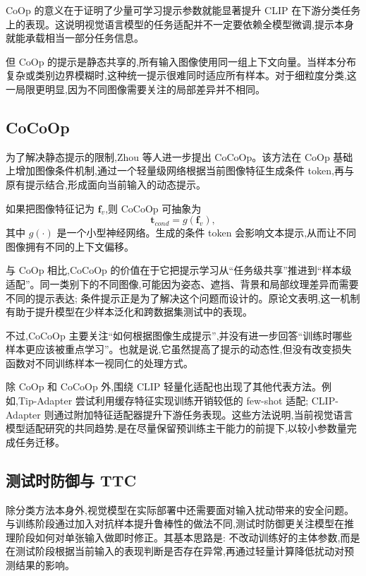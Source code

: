 CoOp 的意义在于证明了少量可学习提示参数就能显著提升 CLIP 在下游分类任务上的表现\cite{coop2022}。这说明视觉语言模型的任务适配并不一定要依赖全模型微调,提示本身就能承载相当一部分任务信息。

但 CoOp 的提示是静态共享的,所有输入图像使用同一组上下文向量。当样本分布复杂或类别边界模糊时,这种统一提示很难同时适应所有样本。对于细粒度分类,这一局限更明显,因为不同图像需要关注的局部差异并不相同。

\subsection{CoCoOp}

为了解决静态提示的限制,Zhou 等人进一步提出 CoCoOp\cite{cocoop2022}。该方法在 CoOp 基础上增加图像条件机制,通过一个轻量级网络根据当前图像特征生成条件 token,再与原有提示结合,形成面向当前输入的动态提示。

如果把图像特征记为 \(\mathbf{f}_v\),则 CoCoOp 可抽象为
\begin{equation}
\mathbf{t}_{cond}=g(\mathbf{f}_v),
\end{equation}
其中 \(g(\cdot)\) 是一个小型神经网络。生成的条件 token 会影响文本提示,从而让不同图像拥有不同的上下文偏移。

与 CoOp 相比,CoCoOp 的价值在于它把提示学习从“任务级共享”推进到“样本级适配”。同一类别下的不同图像,可能因为姿态、遮挡、背景和局部纹理差异而需要不同的提示表达; 条件提示正是为了解决这个问题而设计的。原论文表明,这一机制有助于提升模型在少样本泛化和跨数据集测试中的表现\cite{cocoop2022}。

不过,CoCoOp 主要关注“如何根据图像生成提示”,并没有进一步回答“训练时哪些样本更应该被重点学习”。也就是说,它虽然提高了提示的动态性,但没有改变损失函数对不同训练样本一视同仁的处理方式。

除 CoOp 和 CoCoOp 外,围绕 CLIP 轻量化适配也出现了其他代表方法。例如,Tip-Adapter 尝试利用缓存特征实现训练开销较低的 few-shot 适配\cite{tipadapter2022}; CLIP-Adapter 则通过附加特征适配器提升下游任务表现\cite{clipadapter2022}。这些方法说明,当前视觉语言模型适配研究的共同趋势,是在尽量保留预训练主干能力的前提下,以较小参数量完成任务迁移。

\subsection{测试时防御与 TTC}

除分类方法本身外,视觉模型在实际部署中还需要面对输入扰动带来的安全问题。与训练阶段通过加入对抗样本提升鲁棒性的做法不同,测试时防御更关注模型在推理阶段如何对单张输入做即时修正。其基本思路是: 不改动训练好的主体参数,而是在测试阶段根据当前输入的表现判断是否存在异常,再通过轻量计算降低扰动对预测结果的影响。

